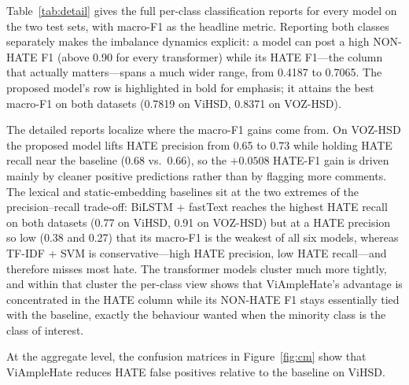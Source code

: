 \documentclass[11pt]{article}
\begin{document}
Table~\ref{tab:detail} gives the full per-class classification reports for every model on the two test sets, with macro-F1 as the headline metric. Reporting both classes separately makes the imbalance dynamics explicit: a model can post a high NON-HATE F1 (above 0.90 for every transformer) while its HATE F1---the column that actually matters---spans a much wider range, from 0.4187 to 0.7065. The proposed model's row is highlighted in bold for emphasis; it attains the best macro-F1 on both datasets (0.7819 on ViHSD, 0.8371 on VOZ-HSD).

The detailed reports localize where the macro-F1 gains come from. On VOZ-HSD the proposed model lifts HATE precision from 0.65 to 0.73 while holding HATE recall near the baseline (0.68 vs.\ 0.66), so the $+0.0508$ HATE-F1 gain is driven mainly by cleaner positive predictions rather than by flagging more comments. The lexical and static-embedding baselines sit at the two extremes of the precision--recall trade-off: BiLSTM + fastText reaches the highest HATE recall on both datasets (0.77 on ViHSD, 0.91 on VOZ-HSD) but at a HATE precision so low (0.38 and 0.27) that its macro-F1 is the weakest of all six models, whereas TF-IDF + SVM is conservative---high HATE precision, low HATE recall---and therefore misses most hate. The transformer models cluster much more tightly, and within that cluster the per-class view shows that ViAmpleHate's advantage is concentrated in the HATE column while its NON-HATE F1 stays essentially tied with the baseline, exactly the behaviour wanted when the minority class is the class of interest.

\begin{table}[!t]
  \centering
  \small
  \caption{Per-class results of ViAmpleHate (test set).}
  \label{tab:perclass}
\end{table}

At the aggregate level, the confusion matrices in Figure~\ref{fig:cm} show that ViAmpleHate reduces HATE false positives relative to the baseline on ViHSD.
\end{document}
